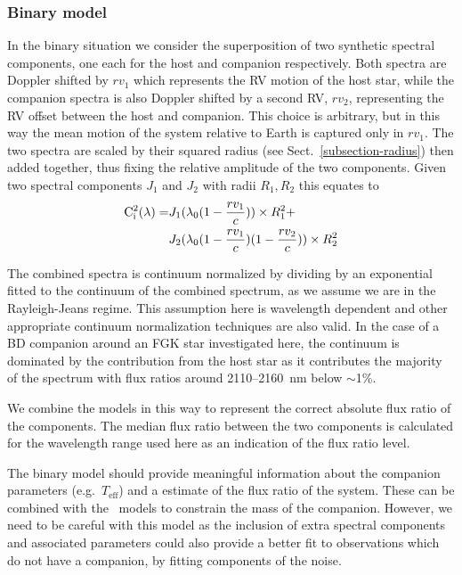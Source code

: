 \subsubsection{Binary model}
\label{subsubsec:binary-model}
In the binary situation we consider the superposition of two synthetic spectral components, one each for the host and companion respectively. Both spectra are Doppler shifted by \({rv}_1\) which represents the RV motion of the host star, while the companion spectra is also Doppler shifted by a second RV, \({rv}_2 \), representing the RV offset between the host and companion. This choice is arbitrary, but in this way the mean motion of the system relative to Earth is captured only in \({rv}_1\). The two spectra are scaled by their squared radius (see Sect.~\ref{subsection-radius}) then added together, thus fixing the relative amplitude of the two components. 
Given two spectral components \(J_{1} \) and \(J_{2} \) with radii \(R_1, R_2\) this equates to
\begin{align}
\rm C^{2}_{i}(\lambda) = &  J_{1}(\lambda_{0}(1 - \frac{rv_{1}}{c}))\times R_{1}^2 +\nonumber \\
& J_{2}(\lambda_{0}(1-\frac{rv_{1}}{c})(1-\frac{rv_{2}}{c}))\times R_{2}^2
\end{align}


The combined spectra is continuum normalized by dividing by an exponential fitted to the continuum of the combined spectrum, as we assume we are in the Rayleigh-Jeans regime. This assumption here is wavelength dependent and other appropriate continuum normalization techniques are also valid. In the case of a BD companion around an FGK star investigated here, the continuum is dominated by the contribution from the host star as it contributes the majority of the spectrum with flux ratios around 2110--2160~nm below \(\sim\)1\%.

We combine the models in this way to represent the correct absolute flux ratio of the components. The median flux ratio between the two components is calculated for the wavelength range used here as an indication of the flux ratio level.

The binary model should provide meaningful information about the companion parameters (e.g.\ \(T_{\textrm{eff}}\)) and a estimate of the flux ratio of the system. These can be combined with the~\citet{baraffe_evolutionary_2003} models to constrain the mass of the companion. However, we need to be careful with this model as the inclusion of extra spectral components and associated parameters could also provide a better fit to observations which do not have a companion, by fitting components of the noise.\\

